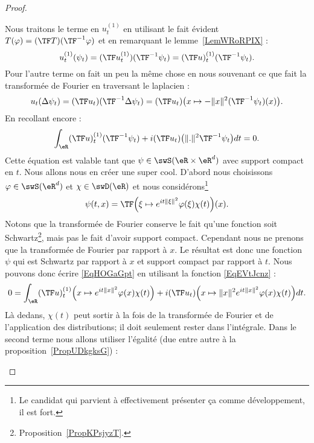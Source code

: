 \begin{proof}
\begin{subproof}
        Nous traitons le terme en \( u_t^{(1)}\) en utilisant le fait évident \( T(\varphi)=(\TF T)(\TF^{-1}\varphi)\) et en remarquant le lemme~\ref{LemWRoRPIX} :
        \begin{equation}
            u_t^{(1)}(\psi_t)=(\TF u_t^{(1)})(\TF^{-1}\psi_t)=(\TF u)_t^{(1)}(\TF^{-1}\psi_t).
        \end{equation}
        Pour l'autre terme on fait un peu la même chose en nous souvenant ce que fait la transformée de Fourier en traversant le laplacien :
        \begin{equation}
            u_t(\Delta\psi_t)=(\TF u_t)(\TF^{-1}\Delta\psi_t)=(\TF u_t)\big( x\mapsto -\| x \|^2(\TF^{-1}\psi_t)(x) \big).
        \end{equation}
        En recollant encore :
        \begin{equation}    \label{EqHOGaGpt}
            \int_{\eR}(\TF u)^{(1)}_t(\TF^{-1}\psi_t)+i(\TF u_t)\big( \| . \|^2\TF^{-1}\psi_t \big)dt=0.
        \end{equation}
        Cette équation est valable tant que \( \psi\in \swS(\eR\times\eR^d)\) avec support compact en \( t\). Nous allons nous en créer une super cool. D'abord nous choisissons \( \varphi\in\swS(\eR^d)\) et \( \chi\in\swD(\eR)\) et nous considérons\footnote{Le candidat qui parvient à effectivement présenter ça comme développement, il est fort.}
        \begin{equation}    \label{EqEVtJcnz}
            \psi(t,x)=\TF\Big( \xi\mapsto  e^{it\| \xi \|^2}\varphi(\xi)\chi(t) \Big)(x).
        \end{equation}
        Notons que la transformée de Fourier conserve le fait qu'une fonction soit Schwartz\footnote{Proposition~\ref{PropKPsjyzT}.}, mais pas le fait d'avoir support compact. Cependant nous ne prenons que la transformée de Fourier par rapport à \( x\). Le résultat est donc une fonction \( \psi\) qui est Schwartz par rapport à \( x\) et support compact par rapport à \( t\). Nous pouvons donc écrire \eqref{EqHOGaGpt} en utilisant la fonction \eqref{EqEVtJcnz} :
        \begin{equation}    \label{EqHPUyZFz}
            0=\int_{\eR}(\TF u)_t^{(1)}\Big( x\mapsto e^{it\| x \|^2}\varphi(x)\chi(t) \Big)+i(\TF u_t)\Big( x\mapsto\| x \|^2 e^{it\| x \|^2}\varphi(x)\chi(t) \Big)dt.
        \end{equation}
        Là dedans, \( \chi(t)\) peut sortir à la fois de la transformée de Fourier et de l'application des distributions; il doit seulement rester dans l'intégrale. Dans le second terme nous allons utiliser l'égalité (due entre autre à la proposition~\ref{PropUDkgksG}) :

\end{subproof}
\end{proof}
